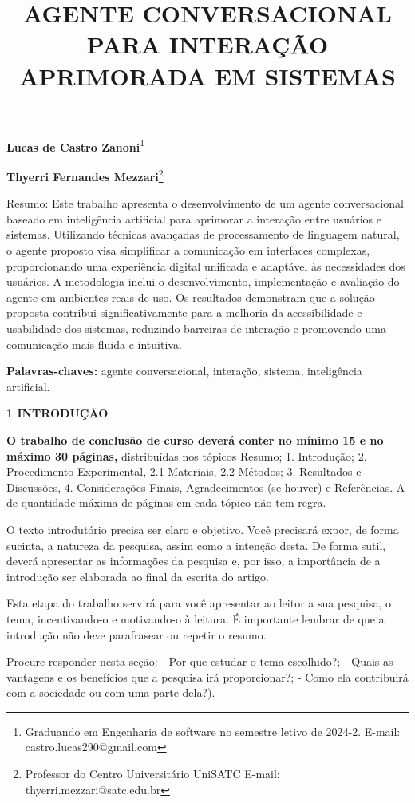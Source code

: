 \documentclass[
]{article}
\title{\textbf{AGENTE CONVERSACIONAL PARA INTERAÇÃO APRIMORADA EM
SISTEMAS}}
\author{}
\date{}
\begin{document}
\maketitle

\textbf{Lucas de Castro Zanoni}\footnote{Graduando em Engenharia de
  software no semestre letivo de 2024-2. E-mail:
  castro.lucas290@gmail.com}

\textbf{Thyerri Fernandes Mezzari}\footnote{Professor do Centro
  Universitário UniSATC E-mail: thyerri.mezzari@satc.edu.br}

Resumo: Este trabalho apresenta o desenvolvimento de um agente
conversacional baseado em inteligência artificial para aprimorar a
interação entre usuários e sistemas. Utilizando técnicas avançadas de
processamento de linguagem natural, o agente proposto visa simplificar a
comunicação em interfaces complexas, proporcionando uma experiência
digital unificada e adaptável às necessidades dos usuários. A
metodologia inclui o desenvolvimento, implementação e avaliação do
agente em ambientes reais de uso. Os resultados demonstram que a solução
proposta contribui significativamente para a melhoria da acessibilidade
e usabilidade dos sistemas, reduzindo barreiras de interação e
promovendo uma comunicação mais fluida e intuitiva.

\textbf{Palavras-chaves:} agente conversacional, interação, sistema,
inteligência artificial.

\textbf{1 INTRODUÇÃO}

\textbf{O trabalho de conclusão de curso deverá conter no mínimo 15 e no
máximo 30 páginas,} distribuídas nos tópicos Resumo; 1. Introdução; 2.
Procedimento Experimental, 2.1 Materiais, 2.2 Métodos; 3. Resultados e
Discussões, 4. Considerações Finais, Agradecimentos (se houver) e
Referências. A de quantidade máxima de páginas em cada tópico não tem
regra.

O texto introdutório precisa ser claro e objetivo. Você precisará expor,
de forma sucinta, a natureza da pesquisa, assim como a intenção desta.
De forma sutil, deverá apresentar as informações da pesquisa e, por
isso, a importância de a introdução ser elaborada ao final da escrita do
artigo.

Esta etapa do trabalho servirá para você apresentar ao leitor a sua
pesquisa, o tema, incentivando-o e motivando-o à leitura. É importante
lembrar de que a introdução não deve parafrasear ou repetir o resumo.

Procure responder nesta seção: - Por que estudar o tema escolhido?; -
Quais as vantagens e os benefícios que a pesquisa irá proporcionar?; -
Como ela contribuirá com a sociedade ou com uma parte dela?).
\end{document}
